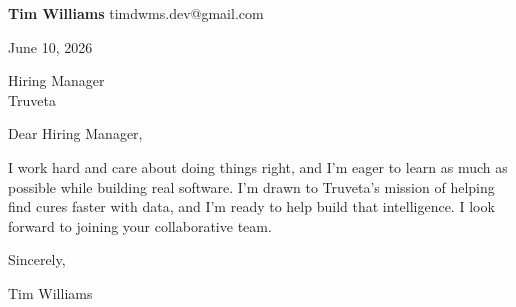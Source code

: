 \documentclass[12pt]{article}
\begin{document}
\textbf{Tim Williams} \hfill timdwms.dev@gmail.com

\vspace{1em}

June 10, 2026

\vspace{1em}

Hiring Manager \\
Truveta

\vspace{1em}

Dear Hiring Manager,

I work hard and care about doing things right, and I'm eager to learn as much as possible while building real software. I'm drawn to Truveta's mission of helping find cures faster with data, and I'm ready to help build that intelligence. I look forward to joining your collaborative team.

\vspace{1em}

Sincerely,

\vspace{2em}

Tim Williams
\end{document}
